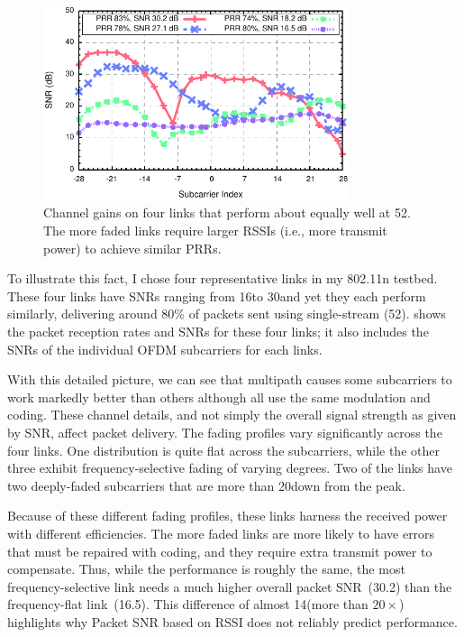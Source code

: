\begin{figure}[t]
  \centering
  \includegraphics[width=0.8\textwidth]{figures/approach/fsf_shape.pdf}
  \caption[Channel gains on four links that perform about equally well at 52\Mbps]{Channel gains on four links that perform about equally well at 52\Mbps. The more faded links require larger RSSIs (i.e., more transmit power) to achieve similar PRRs.}
  \label{fig:example_fsf_shape}

\end{figure}

To illustrate this fact, I chose four representative links in my 802.11n testbed. These four links have SNRs ranging from 16\dB to 30\dB and yet they each perform similarly, delivering around 80\% of packets sent using single-stream  (52\Mbps).  shows the packet reception rates and SNRs for these four links; it also includes the SNRs of the individual OFDM subcarriers for each links.

With this detailed picture, we can see that multipath causes some subcarriers to work markedly better than others although all use the same modulation and coding. These channel details, and not simply the overall signal strength as given by SNR, affect packet delivery. The fading profiles vary significantly across the four links. One distribution is quite flat across the subcarriers, while the other three exhibit frequency-selective fading of varying degrees. Two of the links have two deeply-faded subcarriers that are more than 20\dB down from the peak.

Because of these different fading profiles, these links harness the received power with different efficiencies.
The more faded links are more likely to have errors that must be repaired with coding, and they require extra transmit power to compensate. Thus, while the performance is roughly the same, the most frequency-selective link needs a much higher overall packet SNR~(30.2\dB) than the frequency-flat link~(16.5\dB). This difference of almost 14\dB (more than $20\times$) highlights why Packet SNR based on RSSI does not reliably predict performance.

